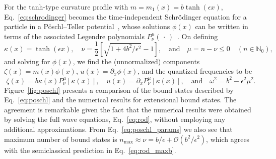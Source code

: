 For the tanh-type curvature profile with $m = m_{1}(x) = b\tanh(\epsilon x)$, Eq.~\eqref{eq:schrodinger} becomes the time-independent Schr\"{o}dinger equation for a particle in a P\"{o}schl--Teller potential~\cite{poschl1933,rosen1932}, whose solutions $\phi(x)$ can be written in terms of the associated Legendre polynomials $P^{\mu}_{\nu}(\,\cdot\,)$~\cite{olver2010}.
On defining
%
\begin{equation}
  \kappa(x) = \tanh(\epsilon x),
  \quad
  \nu = \frac{1}{2}\left[\sqrt{1 + 4b^{2}/\epsilon^{2}} - 1\right],
  \quad\text{and}\quad
  \mu = n - \nu \leq 0
  \quad(n \in \mathbb{N}_{0}),
  \label{eq:poschl_params}
\end{equation}
%
and solving for $\phi(x)$, we find the (unnormalized) components $\zeta(x) = m(x)\phi(x)$, $u(x) = \partial_{x}\phi(x)$, and the quantized frequencies to be
%
\begin{equation}
  \zeta(x) = b\kappa(x)P^{\mu}_{\nu}\left[\kappa(x)\right],
  \quad
  u(x) = \partial_{x}P^{\mu}_{\nu}\left[\kappa(x)\right],
  \quad\text{and}\quad
  \omega^{2} = b^{2} - \epsilon^{2}\mu^{2}.
  \label{eq:poschl}
\end{equation}
%
Figure~\ref{fig:poschl} presents a comparison of the bound states described by Eq.~\eqref{eq:poschl} and the numerical results for extensional bound states.
The agreement is remarkable given the fact that the numerical results were obtained by solving the full wave equations, Eq.~\eqref{eq:rod}, without employing any additional approximations.
From Eq.~\eqref{eq:poschl_params} we also see that maximum number of bound states is $n_{\text{max}} \approx \nu = b/\epsilon + \mathcal{O}(b^{2}/\epsilon^{2})$, which agrees with the semiclassical prediction in Eq.~\eqref{eq:rod_maxb}.

